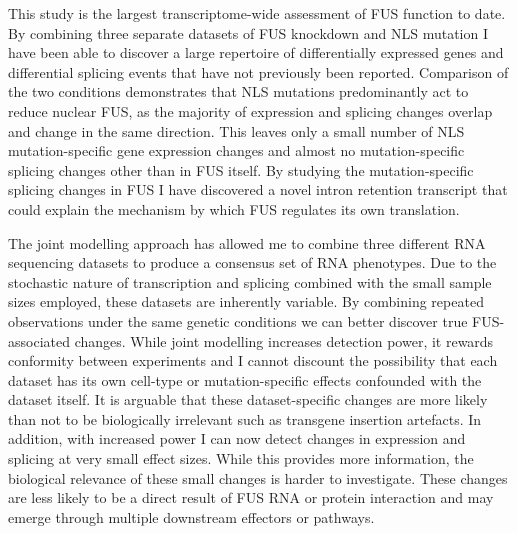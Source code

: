 This study is the largest transcriptome-wide assessment of FUS function to date.
By combining three separate datasets of FUS knockdown and NLS mutation I have been able to discover a large repertoire of differentially expressed genes and differential splicing events that have not previously been reported.
Comparison of the two conditions demonstrates that NLS mutations predominantly act to reduce nuclear FUS, as the majority of expression and splicing changes overlap and change in the same direction.
This leaves only a small number of NLS mutation-specific gene expression changes and almost no mutation-specific splicing changes other than in FUS itself. 
By studying the mutation-specific splicing changes in FUS I have discovered a novel intron retention transcript that could explain the mechanism by which FUS regulates its own translation.

The joint modelling approach has allowed me to combine three different RNA sequencing datasets to produce a consensus set of RNA phenotypes.
Due to the stochastic nature of transcription and splicing combined with the small sample sizes employed, these datasets are inherently variable.
By combining repeated observations  under the same genetic conditions we can better discover true FUS-associated changes.
While joint modelling increases detection power, it rewards conformity between experiments and I cannot discount the possibility that each dataset has its own cell-type or mutation-specific effects confounded with the dataset itself.
It is arguable that these dataset-specific changes are more likely than not to be biologically irrelevant such as transgene insertion artefacts. 
In addition, with increased power I can now detect changes in expression and splicing at very small effect sizes. 
While this provides more information, the biological relevance of these small changes is harder to investigate.
These changes are less likely to be a direct result of FUS RNA or protein interaction and may emerge through multiple downstream effectors or pathways.

